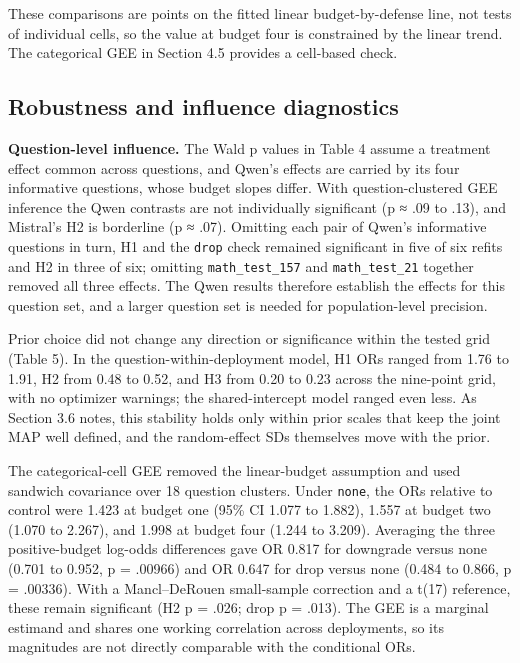 \documentclass[11pt]{article}
\begin{document}
These comparisons are points on the fitted linear budget-by-defense line, not tests of individual cells, so the value at budget four is constrained by the linear trend. The categorical GEE in Section 4.5 provides a cell-based check.

\subsection{Robustness and influence diagnostics}

\textbf{Question-level influence.} The Wald p values in Table 4 assume a treatment effect common across questions, and Qwen's effects are carried by its four informative questions, whose budget slopes differ. With question-clustered GEE inference the Qwen contrasts are not individually significant (p ≈ .09 to .13), and Mistral's H2 is borderline (p ≈ .07). Omitting each pair of Qwen's informative questions in turn, H1 and the \texttt{drop} check remained significant in five of six refits and H2 in three of six; omitting \texttt{math\_test\_157} and \texttt{math\_test\_21} together removed all three effects. The Qwen results therefore establish the effects for this question set, and a larger question set is needed for population-level precision.

Prior choice did not change any direction or significance within the tested grid (Table 5). In the question-within-deployment model, H1 ORs ranged from 1.76 to 1.91, H2 from 0.48 to 0.52, and H3 from 0.20 to 0.23 across the nine-point grid, with no optimizer warnings; the shared-intercept model ranged even less. As Section 3.6 notes, this stability holds only within prior scales that keep the joint MAP well defined, and the random-effect SDs themselves move with the prior.

The categorical-cell GEE removed the linear-budget assumption and used sandwich covariance over 18 question clusters. Under \texttt{none}, the ORs relative to control were 1.423 at budget one (95\% CI 1.077 to 1.882), 1.557 at budget two (1.070 to 2.267), and 1.998 at budget four (1.244 to 3.209). Averaging the three positive-budget log-odds differences gave OR 0.817 for downgrade versus none (0.701 to 0.952, p = .00966) and OR 0.647 for drop versus none (0.484 to 0.866, p = .00336). With a Mancl–DeRouen small-sample correction and a t(17) reference, these remain significant (H2 p = .026; drop p = .013). The GEE is a marginal estimand and shares one working correlation across deployments, so its magnitudes are not directly comparable with the conditional ORs.
\end{document}
